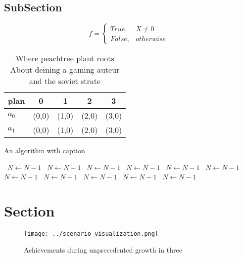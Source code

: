 \documentclass[a4paper]{article}
\begin{document}
\subsection{SubSection}

\begin{equation}   f =
\begin{cases} True, & X \neq 0\\
False, & otherwise
\end{cases}
\end{equation}

\begin{table}
\begin{adjustbox}{width=0.5\columnwidth}
\begin{tabular}{|l|l|l|l|l|}
\hline
\textbf{plan} & \multicolumn{1}{c|}{\textbf{0}} & \multicolumn{1}{c|}{\textbf{1}} & \multicolumn{1}{c|}{\textbf{2}} & \multicolumn{1}{c|}{\textbf{3}} \\ \hline
\textbf{$a_0$}  & (0,0) & (1,0) & (2,0) & (3,0) \\ \hline
\textbf{$a_1$}  & (0,0) & (1,0) & (2,0) & (3,0) \\ \hline
\end{tabular}
\end{adjustbox}
\caption{Where peachtree plant roots About deining a gaming auteur and the soviet strate
}
\end{table}

\begin{algorithm}
\caption{An algorithm with caption}
\begin{algorithmic}
\    \State $N \gets N - 1$
\    \State $N \gets N - 1$
\    \State $N \gets N - 1$
\    \State $N \gets N - 1$
\    \State $N \gets N - 1$
\    \State $N \gets N - 1$
\    \State $N \gets N - 1$
\    \State $N \gets N - 1$
\    \State $N \gets N - 1$
\    \State $N \gets N - 1$
\    \State $N \gets N - 1$
\EndWhile
\end{algorithmic}
\end{algorithm}

\section{Section}

\begin{figure}
\centering
\texttt{[image: ../scenario\_visualization.png]}
\caption{Achievements during unprecedented growth in three
}
\end{figure}
 
\end{document}
